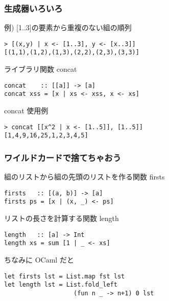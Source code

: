\documentclass[dvipdfmx,cjk,xcolor=dvipsnames,envcountsect,notheorems,12pt]{beamer}
\theoremstyle{definition}
\begin{document}
\begin{frame}[fragile]
\frametitle{生成器いろいろ}
  \begin{exampleblock}{例) [1..3]の要素から重複のない組の順列}
\begin{lstlisting}[frame=none]
> [(x,y) | x <- [1..3], y <- [x..3]] 
[(1,1),(1,2),(1,3),(2,2),(2,3),(3,3)]
\end{lstlisting}
\end{exampleblock}
\begin{block}{ライブラリ関数 concat} %
\begin{lstlisting}[frame=none]
concat    :: [[a]] -> [a]
concat xss = [x | xs <- xss, x <- xs]
\end{lstlisting}
\end{block}
\begin{exampleblock}{concat 使用例}
\begin{lstlisting}[frame=none]
> concat [[x^2 | x <- [1..5]], [1..5]]
[1,4,9,16,25,1,2,3,4,5]
\end{lstlisting}
\end{exampleblock}
\end{frame}

\begin{frame}[fragile]
\frametitle{ワイルドカードで捨てちゃおう}%
\begin{exampleblock}{組のリストから組の先頭のリストを作る関数 firsts}
\begin{lstlisting}[frame=none]
firsts   :: [(a, b)] -> [a]
firsts ps = [x | (x, _) <- ps]
\end{lstlisting}
\end{exampleblock}
\begin{exampleblock}{リストの長さを計算する関数 length}
\begin{lstlisting}[frame=none]
length   :: [a] -> Int
length xs = sum [1 | _ <- xs]
\end{lstlisting}
\end{exampleblock}
ちなみに OCaml だと
\begin{lstlisting}[language={[Objective]Caml}, frame=none]
let firsts lst = List.map fst lst
let length lst = List.fold_left 
                   (fun n _ -> n+1) 0 lst
\end{lstlisting}
\end{frame}


\end{document}
